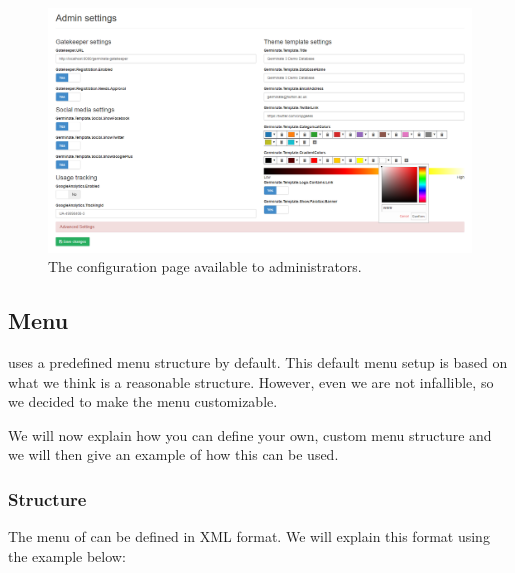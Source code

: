 \begin{figure}
	\centering
	\includegraphics[width=1\textwidth]{img/configuration/admin-config.png}
	\caption{The {\germinate} configuration page available to administrators.}
	\label{fig:admin-config}
\end{figure}

\subsection{{\germinate} Menu}
\label{sec:menu}
{\germinate} uses a predefined menu structure by default. This default menu setup is based on what we think is a reasonable structure. However, even we are not infallible, so we decided to make the menu customizable.

We will now explain how you can define your own, custom menu structure and we will then give an example of how this can be used.

\subsubsection{Structure}
The menu of {\germinate} can be defined in XML format. We will explain this format using the example below:

